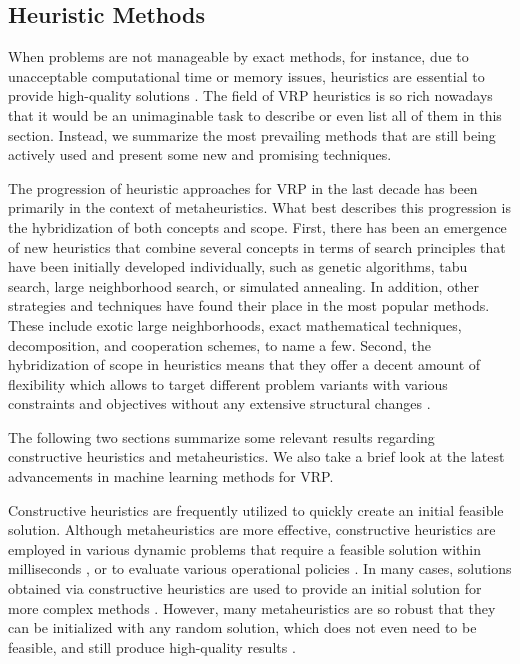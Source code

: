 \subsection{Heuristic Methods} \label{sec:heuristics}

When problems are not manageable by exact methods, for instance, due to unacceptable computational time or memory issues, heuristics are essential to provide high-quality solutions \cite{darp-survey}. The field of VRP heuristics is so rich nowadays that it would be an unimaginable task to describe or even list all of them in this section. Instead, we summarize the most prevailing methods that are still being actively used and present some new and promising techniques.

The progression of heuristic approaches for VRP in the last decade has been primarily in the context of metaheuristics. What best describes this progression is the hybridization of both concepts and scope. First, there has been an emergence of new heuristics that combine several concepts in terms of search principles that have been initially developed individually, such as genetic algorithms, tabu search, large neighborhood search, or simulated annealing. In addition, other strategies and techniques have found their place in the most popular methods. These include exotic large neighborhoods, exact mathematical techniques, decomposition, and cooperation schemes, to name a few. Second, the hybridization of scope in heuristics means that they offer a decent amount of flexibility which allows to target different problem variants with various constraints and objectives without any extensive structural changes \cite{toth2015vrp}.

The following two sections summarize some relevant results regarding constructive heuristics and metaheuristics. We also take a brief look at the latest advancements in machine learning methods for VRP.


Constructive heuristics are frequently utilized to quickly create an initial feasible solution. Although metaheuristics are more effective, constructive heuristics are employed in various dynamic problems that require a feasible solution within milliseconds \cite{Markovic2015, Wong2014}, or to evaluate various operational policies \cite{Wong2014}. In many cases, solutions obtained via constructive heuristics are used to provide an initial solution for more complex methods \cite{Masmoudi2016, Braekers2014}. However, many metaheuristics are so robust that they can be initialized with any random solution, which does not even need to be feasible, and still produce high-quality results \cite{toth2015vrp}.

